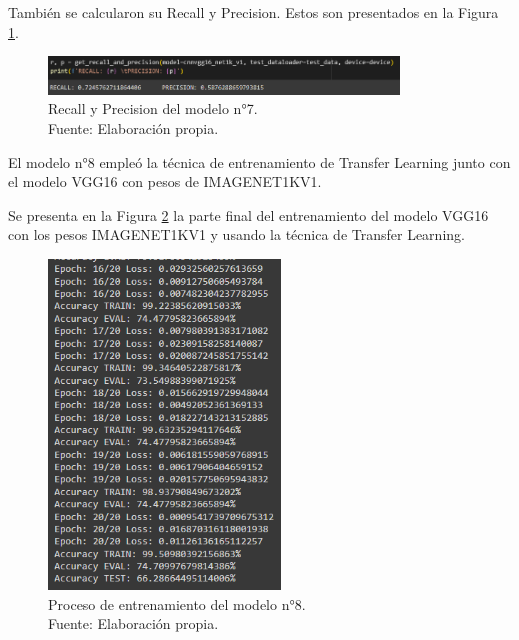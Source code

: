 También se calcularon su Recall y Precision. Estos son presentados en la Figura \ref{4:fig133}.

\begin{figure}[H]
	\begin{center}
		\includegraphics[width=0.83\textwidth]{4/figures/model7_rp.PNG}
		\caption[Recall y Precision del modelo n°7]{Recall y Precision del modelo n°7. \\
		Fuente: Elaboración propia.}
		\label{4:fig133}
	\end{center}
\end{figure}

El modelo n°8 empleó la técnica de entrenamiento de Transfer Learning junto con el modelo VGG16 con pesos de IMAGENET1KV1.

Se presenta en la Figura \ref{4:fig134} la parte final del entrenamiento del modelo VGG16 con los pesos IMAGENET1KV1 y usando la técnica de Transfer Learning.

\begin{figure}[H]
	\begin{center}
		\includegraphics[width=0.55\textwidth]{4/figures/model8_train.PNG}
		\caption[Proceso de entrenamiento del modelo n°8]{Proceso de entrenamiento del modelo n°8. \\
		Fuente: Elaboración propia.}
		\label{4:fig134}
	\end{center}
\end{figure}

